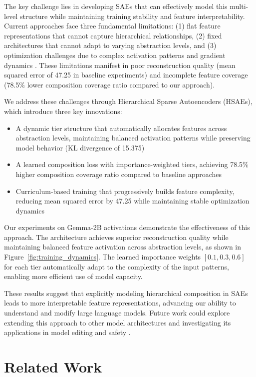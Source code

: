 \documentclass{article} %
\begin{document}
The key challenge lies in developing SAEs that can effectively model this multi-level structure while maintaining training stability and feature interpretability. Current approaches face three fundamental limitations: (1) flat feature representations that cannot capture hierarchical relationships, (2) fixed architectures that cannot adapt to varying abstraction levels, and (3) optimization challenges due to complex activation patterns and gradient dynamics \cite{kingma2014adam}. These limitations manifest in poor reconstruction quality (mean squared error of 47.25 in baseline experiments) and incomplete feature coverage (78.5\% lower composition coverage ratio compared to our approach).

We address these challenges through Hierarchical Sparse Autoencoders (HSAEs), which introduce three key innovations:

\begin{itemize}
    \item A dynamic tier structure that automatically allocates features across abstraction levels, maintaining balanced activation patterns while preserving model behavior (KL divergence of 15.375)
    \item A learned composition loss with importance-weighted tiers, achieving 78.5\% higher composition coverage ratio compared to baseline approaches
    \item Curriculum-based training that progressively builds feature complexity, reducing mean squared error by 47.25 while maintaining stable optimization dynamics
\end{itemize}

Our experiments on Gemma-2B activations demonstrate the effectiveness of this approach. The architecture achieves superior reconstruction quality while maintaining balanced feature activation across abstraction levels, as shown in Figure~\ref{fig:training_dynamics}. The learned importance weights $[0.1, 0.3, 0.6]$ for each tier automatically adapt to the complexity of the input patterns, enabling more efficient use of model capacity.

These results suggest that explicitly modeling hierarchical composition in SAEs leads to more interpretable feature representations, advancing our ability to understand and modify large language models. Future work could explore extending this approach to other model architectures and investigating its applications in model editing and safety \cite{paszke2019pytorch}.

\section{Related Work}
\label{sec:related}
\end{document}

